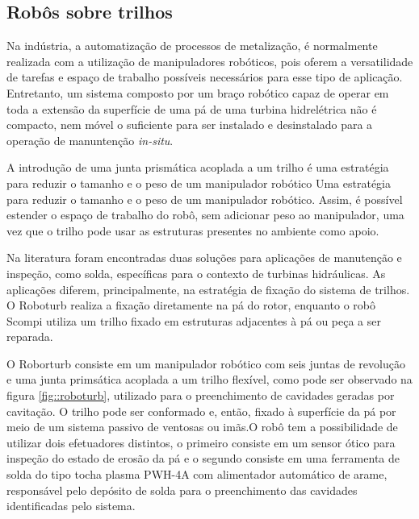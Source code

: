 
\subsection{Robôs sobre trilhos}


Na indústria, a automatização de processos de metalização, é
normalmente realizada com a utilização de manipuladores robóticos, pois oferem a
versatilidade de tarefas e espaço de trabalho possíveis necessários para esse
tipo de aplicação. Entretanto, um sistema composto por um braço robótico capaz
de operar em toda a extensão da superfície de uma pá de uma turbina hidrelétrica
não é compacto, nem móvel o suficiente para ser instalado e desinstalado para a
operação de manuntenção \textit{in-situ}.

A introdução de uma junta prismática acoplada a um trilho é uma estratégia para
reduzir o tamanho e o peso de um manipulador robótico Uma estratégia para reduzir
 o tamanho e o peso de um manipulador robótico.  Assim, é possível estender o
 espaço de trabalho do robô, sem adicionar peso ao manipulador, uma vez que o
 trilho pode usar as estruturas presentes no ambiente como apoio. 

Na literatura foram encontradas duas soluções para aplicações de manutenção e
inspeção, como solda, específicas para o contexto de turbinas hidráulicas. As
aplicações diferem, principalmente, na estratégia de fixação do sistema
de trilhos.
O Roboturb \cite{roboturb} realiza a fixação
diretamente na pá do rotor, enquanto o robô Scompi \cite{scompi} utiliza um
 trilho fixado em
estruturas adjacentes à pá ou peça a ser reparada.

O Roborturb consiste em um manipulador robótico com seis juntas de revolução e
uma junta primsática acoplada a um trilho flexível, como pode ser observado
na figura \ref{fig::roboturb}, utilizado para o preenchimento de cavidades
geradas por cavitação.
O trilho pode ser conformado e, então, fixado à superfície da pá por meio de um
 sistema passivo de ventosas ou imãs.O robô tem 
a possibilidade de utilizar dois efetuadores distintos, o primeiro consiste em 
um sensor ótico para inspeção do estado de erosão da pá e o segundo consiste em
uma ferramenta de solda do tipo tocha plasma PWH-4A com alimentador automático
de arame, responsável pelo depósito de solda para o preenchimento das cavidades
identificadas pelo sistema.

